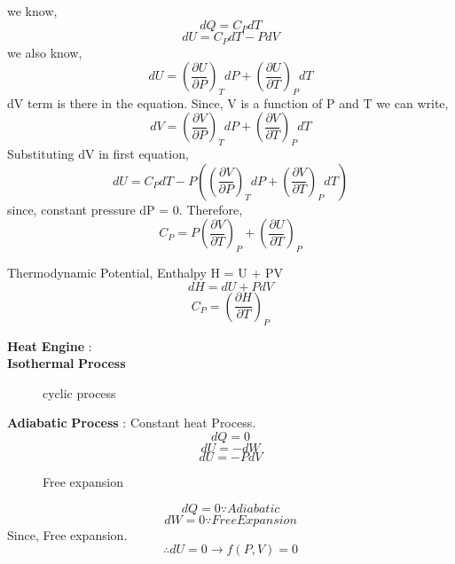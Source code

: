 we know, 
\[
    dQ = C_{P} dT
\]
\[
    dU = C_{P} dT - PdV
\]
we also know,
\[
    dU = \left(\frac{\partial U}{\partial P}\right)_{T} dP + \left(\frac{\partial U}{\partial T}\right)_{P} dT
\] 
dV term is there in the equation. Since, V is a function of P and T we can write,
\[
    dV = \left(\frac{\partial V}{\partial P}\right)_{T} dP + \left(\frac{\partial V}{\partial T}\right)_{P} dT
\]
Substituting dV in first equation,
\[
    dU = C_{P} dT - P\left(\left(\frac{\partial V}{\partial P}\right)_{T} dP + \left(\frac{\partial V}{\partial T}\right)_{P} dT\right)
\]
since, constant pressure dP = 0. Therefore, 
\[
    C_{P} = P \left(\frac{\partial V}{\partial T}\right)_{P} +  \left(\frac{\partial U}{\partial T}\right)_{P}
\]
\begin{definition}[Enthalpy, H]
    Thermodynamic Potential, Enthalpy H = U + PV
    \[
        dH = dU + PdV
    \]
    \[
        C_{P} = \left(\frac{\partial H}{\partial T}\right)_{P} 
    \]
\end{definition}
\textbf{Heat} \textbf{Engine} :\\
\textbf{Isothermal} \textbf{Process} \\
\begin{figure}[H]
    \centering
    \caption{cyclic process}
    \label{fig:cyclic}
\end{figure}
\textbf{Adiabatic} \textbf{Process} : Constant heat Process.
\[
    dQ = 0
\]
\[
    dU = -dW
\]
\[
    dU = -PdV
\]
\begin{eg}
    \begin{figure}[H]
        \centering
        \caption{Free expansion}
        \label{fig:expansion}
    \end{figure}
    \[
        dQ = 0 \because Adiabatic
    \]
    \[
        dW = 0 \because Free Expansion
    \]Since, Free expansion. 
    \[
        \therefore dU = 0 \to f(P,V) = 0
    \]
\end{eg}
